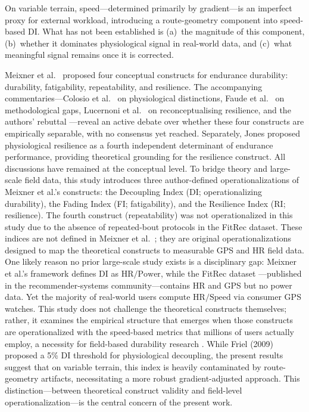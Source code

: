 \documentclass[times, twoside]{zHenriquesLab-StyleBioRxiv}
\begin{document}
On variable terrain, speed---determined primarily by gradient---is an imperfect proxy for external workload, introducing a route-geometry component into speed-based DI. What has not been established is (a)~the magnitude of this component, (b)~whether it dominates physiological signal in real-world data, and (c)~what meaningful signal remains once it is corrected.

Meixner et al.\ \cite{meixner2025} proposed four conceptual constructs for endurance durability: durability, fatigability, repeatability, and resilience. The accompanying commentaries---Colosio et al.\ \cite{colosio2025} on physiological distinctions, Faude et al.\ \cite{faude2025} on methodological gaps, Lucernoni et al.\ \cite{lucernoni2025} on reconceptualising resilience, and the authors' rebuttal \cite{meixner2025last}---reveal an active debate over whether these four constructs are empirically separable, with no consensus yet reached. Separately, Jones \cite{jones2024} proposed physiological resilience as a fourth independent determinant of endurance performance, providing theoretical grounding for the resilience construct. All discussions have remained at the conceptual level. To bridge theory and large-scale field data, this study introduces three author-defined operationalizations of Meixner et al.'s constructs: the Decoupling Index (DI; operationalizing durability), the Fading Index (FI; fatigability), and the Resilience Index (RI; resilience). The fourth construct (repeatability) was not operationalized in this study due to the absence of repeated-bout protocols in the FitRec dataset. These indices are not defined in Meixner et al.\ \cite{meixner2025}; they are original operationalizations designed to map the theoretical constructs to measurable GPS and HR field data. One likely reason no prior large-scale study exists is a disciplinary gap: Meixner et al.'s framework defines DI as $\text{HR}/\text{Power}$, while the FitRec dataset \cite{ni2019}---published in the recommender-systems community---contains HR and GPS but no power data. Yet the majority of real-world users compute $\text{HR}/\text{Speed}$ via consumer GPS watches. This study does not challenge the theoretical constructs themselves; rather, it examines the empirical structure that emerges when those constructs are operationalized with the speed-based metrics that millions of users actually employ, a necessity for field-based durability research \cite{hunter2025}. While Friel (2009) \cite{friel2009} proposed a 5\% DI threshold for physiological decoupling, the present results suggest that on variable terrain, this index is heavily contaminated by route-geometry artifacts, necessitating a more robust gradient-adjusted approach. This distinction---between theoretical construct validity and field-level operationalization---is the central concern of the present work.
\end{document}
